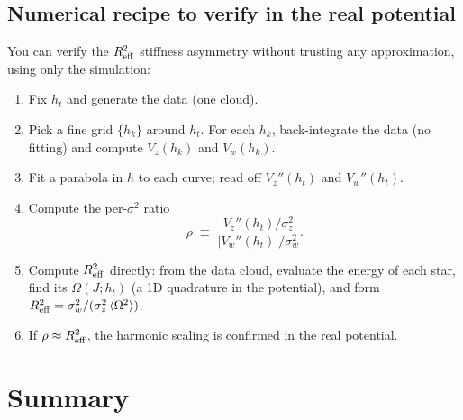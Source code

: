 \documentclass[11pt]{article}
\begin{document}
\subsection{Numerical recipe to verify in the real potential}

You can verify the $R_{\rm eff}^2$ stiffness asymmetry without trusting any
approximation, using only the simulation:
\begin{enumerate}
\item Fix $h_t$ and generate the data (one cloud).
\item Pick a fine grid $\{h_k\}$ around $h_t$. For each $h_k$, back-integrate the
data (no fitting) and compute $V_z(h_k)$ and $V_w(h_k)$.
\item Fit a parabola in $h$ to each curve; read off $V_z''(h_t)$ and $V_w''(h_t)$.
\item Compute the per-$\sigma^2$ ratio
\begin{equation}
\rho \;\equiv\; \frac{V_z''(h_t)/\sigma_z^2}{|V_w''(h_t)|/\sigma_w^2}.
\end{equation}
\item Compute $R_{\rm eff}^2$ directly: from the data cloud, evaluate the energy of
each star, find its $\Omega(J;h_t)$ (a 1D quadrature in the potential), and form
$R_{\rm eff}^2 = \sigma_w^2 / (\sigma_z^2\,\langle\Omega^2\rangle)$.
\item If $\rho \approx R_{\rm eff}^2$, the harmonic scaling is confirmed in the real
potential.
\end{enumerate}

\section{Summary}
\end{document}
